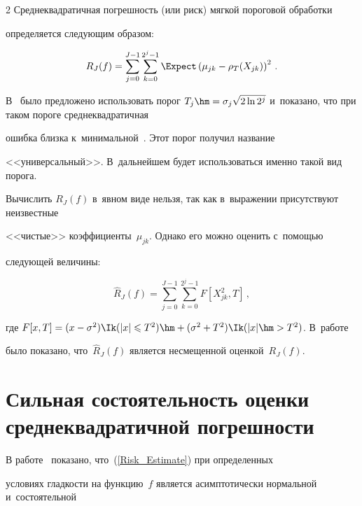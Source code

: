 \begin{multicols}{2}
Среднеквадратичная погрешность (или риск) мягкой пороговой обработки 

определяется следующим образом:

\begin{equation*}

R_J(f)=\sum\limits_{j=0}^{J-1}\sum\limits_{k=0}^{2^j-1}

\Expect\left(\mu_{jk}-\rho_{T}(X_{jk})\right)^2\,.

\end{equation*}



В~\cite{13-sh1} было предложено использовать порог $T_{j} \hm= 

\sigma_{j}\sqrt{2\ln 2^{j}}$ и~показано, что при таком пороге среднеквадратичная 

ошибка близка к~минимальной~\cite{12-sh1}. Этот порог получил название 

<<универсальный>>. В~дальнейшем будет использоваться именно такой вид порога.



Вычислить $R_J(f)$ в~явном виде нельзя, так как в~выражении присутствуют неизвестные 

<<чистые>> коэффициенты~$\mu_{jk}$. Однако его можно оценить с~по\-мощью 

следующей величины:

\begin{equation}

\widehat{R}_J(f)=\sum\limits_{j=0}^{J-1}\sum\limits_{k=0}^{2^j-1}F\left[X_{jk}^2,T\right]\,,

\label{Risk_Estimate}

\end{equation}

где $F[x,T]=(x-\sigma^2)\Ik(|x|\leqslant T^2)\hm+

(\sigma^2+T^2)\Ik(|x|\hm>T^2)$. В~работе~\cite{1-sh1} 

было показано, что~$\widehat{R}_J(f)$ является несмещенной оценкой~$R_J(f)$.



\section{Сильная состоятельность оценки среднеквадратичной погрешности}



В работе~\cite{9-sh1} показано, что~(\ref{Risk_Estimate}) при определенных 

условиях гладкости на функцию~$f$ является асимптотически нормальной и~состоятельной 


\end{multicols}
